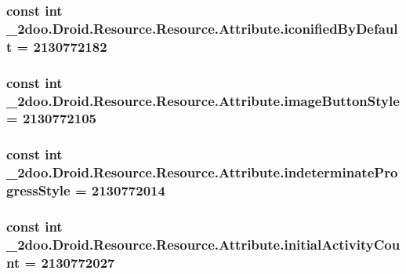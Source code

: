 \hypertarget{class__2doo_1_1_droid_1_1_resource_1_1_attribute_605ed063fa2660eb05370958d4501440}{
\subsubsection[{iconifiedByDefault}]{\setlength{\rightskip}{0pt plus 5cm}const int \_\-2doo.Droid.Resource.Resource.Attribute.iconifiedByDefault = 2130772182}}
\label{class__2doo_1_1_droid_1_1_resource_1_1_attribute_605ed063fa2660eb05370958d4501440}


\hypertarget{class__2doo_1_1_droid_1_1_resource_1_1_attribute_e0ae4cc77ff873a830c17bdd0da4134b}{
\subsubsection[{imageButtonStyle}]{\setlength{\rightskip}{0pt plus 5cm}const int \_\-2doo.Droid.Resource.Resource.Attribute.imageButtonStyle = 2130772105}}
\label{class__2doo_1_1_droid_1_1_resource_1_1_attribute_e0ae4cc77ff873a830c17bdd0da4134b}


\hypertarget{class__2doo_1_1_droid_1_1_resource_1_1_attribute_d278711c3ea0eaf69970af6e45b9f5b2}{
\subsubsection[{indeterminateProgressStyle}]{\setlength{\rightskip}{0pt plus 5cm}const int \_\-2doo.Droid.Resource.Resource.Attribute.indeterminateProgressStyle = 2130772014}}
\label{class__2doo_1_1_droid_1_1_resource_1_1_attribute_d278711c3ea0eaf69970af6e45b9f5b2}


\hypertarget{class__2doo_1_1_droid_1_1_resource_1_1_attribute_5974ba20533fa0be47c1cd6d9c844a54}{
\subsubsection[{initialActivityCount}]{\setlength{\rightskip}{0pt plus 5cm}const int \_\-2doo.Droid.Resource.Resource.Attribute.initialActivityCount = 2130772027}}
\label{class__2doo_1_1_droid_1_1_resource_1_1_attribute_5974ba20533fa0be47c1cd6d9c844a54}


